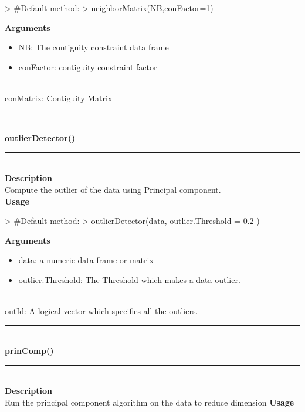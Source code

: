 \documentclass{article}
\begin{document}
\begin{Schunk}
\begin{Sinput}
>   #Default method:
>   neighborMatrix(NB,conFactor=1)
\end{Sinput}
\end{Schunk}
{\bf Arguments}
\begin {itemize}
\item NB: The contiguity constraint data frame
\item conFactor: contiguity constraint factor 
\end {itemize}
\hspace*{5mm}{\bf Returns}\\
 conMatrix: Contiguity Matrix\\
 
\noindent\rule{14cm}{0.4pt}\\
{\bf \large outlierDetector() } \\
\noindent\rule{14cm}{0.4pt}\\
{\bf Description}\\
Compute the outlier of the data using Principal component.\\
{\bf Usage}\\
\begin{Schunk}
\begin{Sinput}
>   #Default method:
>   outlierDetector(data, outlier.Threshold = 0.2 )
\end{Sinput}
\end{Schunk}
{\bf Arguments}
\begin {itemize}
\item data: a numeric data frame or matrix
\item outlier.Threshold: The Threshold which makes a data outlier. 
\end {itemize}
\hspace*{5mm}{\bf Returns}\\
 outId: A logical vector which specifies all the outliers.\\
 \noindent\rule{14cm}{0.4pt}\\
{\bf \large prinComp() } \\
\noindent\rule{14cm}{0.4pt}\\
{\bf Description}\\
Run the principal component algorithm on the data to reduce dimension
{\bf Usage}\\
\end{document}
